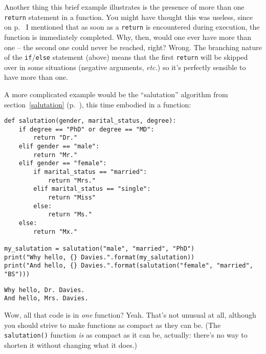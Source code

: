 Another thing this brief example illustrates is the presence of more than one
\texttt{return} statement in a function. You might have thought this was
useless, since on p.~\pageref{returnImmediatelyReturns} I mentioned that as
soon as a \texttt{return} is encountered during execution, the function is
immediately completed. Why, then, would one ever have more than one -- the
second one could never be reached, right? Wrong. The branching nature of the
\texttt{if}/\texttt{else} statement (above) means that the first
\texttt{return} will be skipped over in some situations (negative arguments,
\textit{etc.}) so it's perfectly sensible to have more than one.

A more complicated example would be the ``salutation'' algorithm from
section~\ref{salutation} (p.~\pageref{salutation}), this time embodied in a
function:

\begin{Verbatim}[fontsize=\small,samepage=true,frame=single,framesep=3mm]
def salutation(gender, marital_status, degree):
    if degree == "PhD" or degree == "MD":
        return "Dr."
    elif gender == "male":
        return "Mr."
    elif gender == "female":
        if marital_status == "married":
            return "Mrs."
        elif marital_status == "single":
            return "Miss"
        else:
            return "Ms."
    else:
        return "Mx."

my_salutation = salutation("male", "married", "PhD")
print("Why hello, {} Davies.".format(my_salutation))
print("And hello, {} Davies.".format(salutation("female", "married", "BS")))
\end{Verbatim}
\vspace{-.2in}

\begin{Verbatim}[fontsize=\small,samepage=true,frame=leftline,framesep=5mm,framerule=1mm]
Why hello, Dr. Davies.
And hello, Mrs. Davies.
\end{Verbatim}

Wow, all that code is in \textit{one} function? Yeah. That's not unusual at
all, although you should strive to make functions as compact as they can be.
(The \texttt{salutation()} function \textit{is} as compact as it can be,
actually: there's no way to shorten it without changing what it does.)


